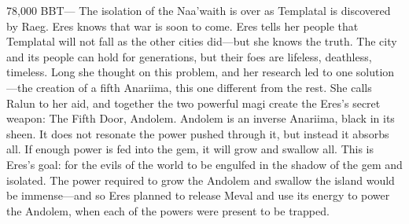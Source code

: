 \documentclass[smalldemyvopaper,11pt,twoside,onecolumn,openright,extrafontsizes]{memoir}
\begin{document}
{{78,000 BBT— The isolation of the Naa’waith is over as Templatal is discovered by Raeg. Eres knows that war is soon to come. Eres tells her people that Templatal will not fall as the other cities did—but she knows the truth. The city and its people can hold for generations, but their foes are lifeless, deathless, timeless.  Long she thought on this problem, and her research led to one solution—the creation of a fifth Anariima, this one different from the rest. She calls Ralun to her aid, and together the two powerful magi create the Eres’s secret weapon: The Fifth Door, Andolem. Andolem is an inverse Anariima, black in its sheen. It does not resonate the power pushed through it, but instead it absorbs all. If enough power is fed into the gem, it will grow and swallow all. This is Eres’s goal: for the evils of the world to be engulfed in the shadow of the gem and isolated. The power required to grow the Andolem and swallow the island would be immense—and so Eres planned to release Meval and use its energy to power the Andolem, when each of the powers were present to be trapped. 
}}
\end{document}
